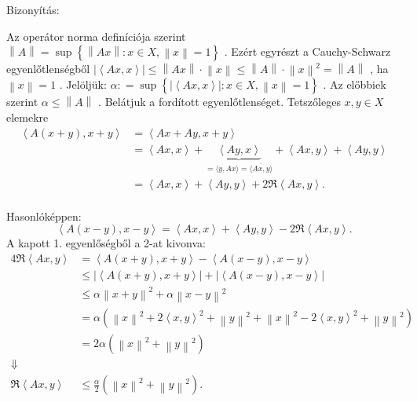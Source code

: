\documentclass[12pt,a4paper]{scrartcl}
\newenvironment{bizonyitas}{}{}
\begin{document}
\begin{bizonyitas}

Bizonyítás:

Az operátor norma definíciója szerint
\(\left\| A \right\| = \sup\left\{ {\left\| {Ax} \right\|:x \in X,\left\| x \right\| = 1} \right\}\)
. Ezért egyrészt a Cauchy-Schwarz egyenlőtlenségből
\(\left| \left\langle {Ax,x} \right\rangle \right| \leq \left\| {Ax} \right\| \cdot \left\| x \right\| \leq \left\| A \right\| \cdot \left\| x \right\|^{2} = \left\| A \right\|\)
, ha \(\left\| x \right\| = 1\) . Jelöljük:
\(\alpha: = \sup\left\{ {\left| \left\langle {Ax,x} \right\rangle \right|:x \in X,\left\| x \right\| = 1} \right\}\)
. Az előbbiek szerint \(\alpha \leq \left\| A \right\|\) . Belátjuk a
fordított egyenlőtlenséget. Tetszőleges \(x,y \in X\) elemekre
\[\begin{aligned}
    \left\langle {A\left( {x + y} \right),x + y} \right\rangle  &  = \left\langle {Ax + Ay,x + y} \right\rangle  \\ 
    &  = \left\langle {Ax,x} \right\rangle  + \underbrace {\left\langle {Ay,x} \right\rangle }_{ = \langle y,Ax\rangle  = \overline {\langle Ax,y\rangle } } + \left\langle {Ax,y} \right\rangle  + \left\langle {Ay,y} \right\rangle  \\ 
    &  = \left\langle {Ax,x} \right\rangle  + \left\langle {Ay,y} \right\rangle  + 2\Re \left\langle {Ax,y} \right\rangle . \\ 
    \end{aligned} \]

Hasonlóképpen:
\[\left\langle {A\left( {x - y} \right),x - y} \right\rangle = \left\langle {Ax,x} \right\rangle + \left\langle {Ay,y} \right\rangle - 2\Re\left\langle {Ax,y} \right\rangle.\]
A kapott 1. egyenlőségből a 2-at kivonva: \[\begin{aligned}
  4\Re \left\langle {Ax,y} \right\rangle  &  = \left\langle {A\left( {x + y} \right),x + y} \right\rangle  - \left\langle {A\left( {x - y} \right),x - y} \right\rangle  \\ 
   &  \leqslant \left| {\left\langle {A\left( {x + y} \right),x + y} \right\rangle } \right| + \left| {\left\langle {A\left( {x - y} \right),x - y} \right\rangle } \right| \\ 
   &  \leqslant \alpha {\left\| {x + y} \right\|^2} + \alpha {\left\| {x - y} \right\|^2} \\ 
   &  = \alpha \left( {{{\left\| x \right\|}^2} + 2{{\left\langle {x,y} \right\rangle }^2} + {{\left\| y \right\|}^2} + {{\left\| x \right\|}^2} - 2{{\left\langle {x,y} \right\rangle }^2} + {{\left\| y \right\|}^2}} \right) \\ 
   &  = 2\alpha \left( {{{\left\| x \right\|}^2} + {{\left\| y \right\|}^2}} \right) \\ 
   \Downarrow  \\ 
  \Re \left\langle {Ax,y} \right\rangle  &  \leqslant \frac{\alpha }{2}\left( {{{\left\| x \right\|}^2} + {{\left\| y \right\|}^2}} \right). \\ 
\end{aligned} \]


\end{bizonyitas}
\end{document}
